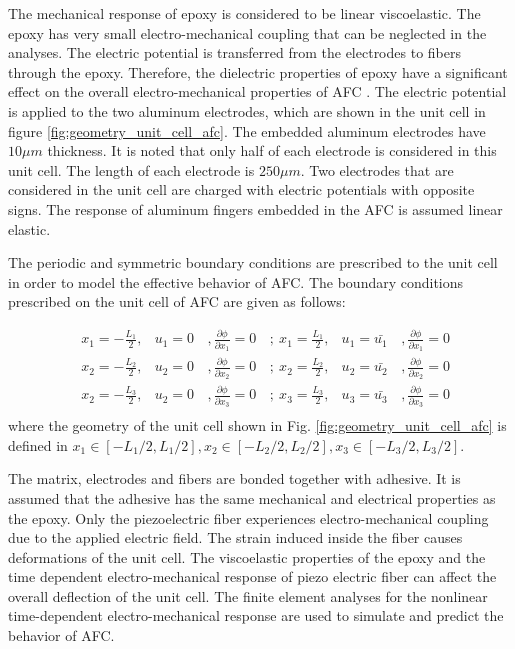 The mechanical response of epoxy is considered to be linear viscoelastic.
The epoxy has very small electro-mechanical coupling that can be neglected in the analyses.
The electric potential is transferred from the electrodes to fibers through the epoxy.
Therefore, the dielectric properties of epoxy have a significant effect on the overall electro-mechanical properties of AFC \cite{atitallah2014parametric}. 
The electric potential is applied to the two aluminum electrodes, which are shown in the unit cell in figure \ref{fig:geometry_unit_cell_afc}.
The embedded aluminum electrodes have $10 \mu m$ thickness.
It is noted that only half of each electrode is considered in this unit cell.
The length of each electrode is $250 \mu m$.
Two electrodes that are considered in the unit cell are charged with electric potentials with opposite signs.
The response of aluminum fingers embedded in the AFC is assumed linear elastic.

The periodic and symmetric boundary conditions are prescribed to the unit cell in order to model the effective behavior of AFC. 
The boundary conditions prescribed on the unit cell of AFC are given as follows:

\begin{equation}
\begin{aligned} 
& x_1=-\frac{L_1}{2}  ,& u_1=0 &\, , \frac{\partial \phi}{\partial x_1}=0        &\, ; \ x_1= \frac{L_1}{2}  ,& u_1=\bar{u_1} &\, ,  \frac{\partial \phi}{\partial x_1}=0   \\ 
& x_2=-\frac{L_2}{2}  ,& u_2=0 &\, , \frac{\partial \phi}{\partial x_2}=0        &\, ; \ x_2= \frac{L_2}{2}  ,& u_2=\bar{u_2} &\, ,  \frac{\partial \phi}{\partial x_2}=0   \\ 
& x_2=-\frac{L_3}{2}  ,& u_2=0 &\, , \frac{\partial \phi}{\partial x_3}=0        &\, ; \ x_3= \frac{L_3}{2}  ,& u_3=\bar{u_3} &\, , \frac{\partial \phi}{\partial x_3}=0    \\
\end{aligned}
\end{equation}
where the geometry of the unit cell shown in Fig. \ref{fig:geometry_unit_cell_afc} is defined in $x_1 \in [-L_1/2,L_1/2], x_2 \in [-L_2/2,L_2/2], x_3 \in [-L_3/2,L_3/2]$.
 

The matrix, electrodes and fibers are bonded together with adhesive. 
It is assumed that the adhesive has the same mechanical and electrical properties as the epoxy.
Only the piezoelectric fiber experiences electro-mechanical coupling due to the applied electric field.
The strain induced inside the fiber causes deformations of the unit cell.
The viscoelastic properties of the epoxy and the time
 dependent electro-mechanical response of piezo electric fiber can affect the overall deflection of the unit cell.
The finite element analyses for the nonlinear time-dependent electro-mechanical response are used to simulate and predict the behavior of AFC. 


